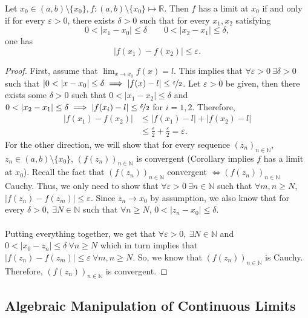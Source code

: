 \documentclass{article}
\newcommand{\R}{\mathbb{R}}
\newcommand{\N}{\mathbb{N}}
\newcommand{\seq}[2]{(#1_{#2})_{#2 \in \N}}
\newcommand{\?}{\stackrel{?}{=}}
\theoremstyle{definition} %
\begin{document}
\begin{itemize}
    \begin{lemma}
        Let $x_0 \in (a, b) \setminus \{x_0\}, f: (a, b) \setminus \{x_0\} \mapsto \R$. Then $f$ has a limit at $x_0$ if and only if for every $\varepsilon > 0$, there exists $\delta > 0$ such that for every $x_1, x_2$ satisfying
        $$0 < |x_1 - x_0| \leq \delta \qquad 0 < |x_2 - x_1| \leq \delta,$$
        one has
        $$|f(x_1) - f(x_2)| \leq \varepsilon.$$
        \label{lemma:cauchy_crit}
    \end{lemma}
    \begin{proof}
        First, assume that $\lim_{x \to x_0} f(x) = l$. This implies that $\forall \varepsilon > 0 \ \exists \delta > 0$ such that $|0 < |x - x_0| \leq \delta \implies |f(x) - l| \leq \nicefrac{\varepsilon}{2}$. Let $\varepsilon > 0$ be given, then there exists some $\delta > 0$ such that $0 < |x_1 - x_2| \leq \delta$ and $0 < |x_2 - x_1| \leq \delta \implies |f(x_i) - l| \leq \nicefrac{\delta}{2}$ for $i = 1, 2$. Therefore,
        \begin{align*}
            |f(x_1) - f(x_2)| &\leq |f(x_1) - l| + |f(x_2) - l| \\
            &\leq \frac{\varepsilon}{2} + \frac{\varepsilon}{2} = \varepsilon.
        \end{align*}
        For the other direction, we will show that for every sequence $\seq{z}{n}$, $z_n \in (a, b) \setminus \{x_0\}$, $(f(z_n))_{n \in \N}$ is convergent (Corollary implies $f$ has a limit at $x_0$). Recall the fact that $(f(z_n))_{n \in \N}$ convergent $\iff (f(z_n))_{n \in \N}$ Cauchy. Thus, we only need to show that $\forall \varepsilon > 0 \ \exists n \in \N$ such that $\forall m, n \geq N$, $|f(z_n) - f(z_m)| \leq \varepsilon$. Since $z_n \rightarrow x_0$ by assumption, we also know that for every $\delta > 0, \ \exists N \in \N$ such that $\forall n \geq N$, $0 < |z_n - x_0| \leq \delta$. \\\\
        Putting everything together, we get that $\forall \varepsilon > 0, \ \exists N \in \N$ and $0 < |x_0 - z_n| \leq \delta \ \forall n \geq N$ which in turn implies that $|f(z_n) - f(z_m)| \leq \varepsilon \ \forall m, n \geq N$. So, we know that $(f(z_n))_{n \in \N}$ is Cauchy. Therefore, $(f(z_n))_{n \in \N}$ is convergent.
    \end{proof}
\end{itemize}

\subsection{Algebraic Manipulation of Continuous Limits}
\end{document}

